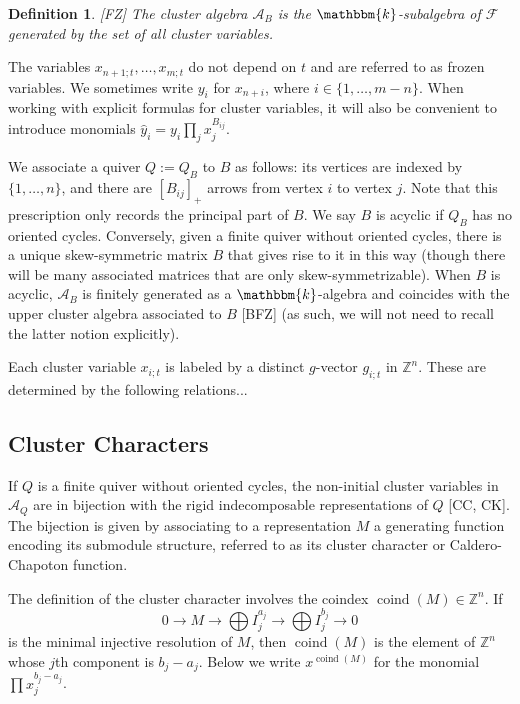 \documentclass[12pt]{amsart}
\newcommand{\sayHW}[1]{\say[HW]{\color{violet}{\bf HW:}\;#1}}
\newcommand{\sayDR}[1]{\say[DR]{\color{red}{\bf DR:}\;#1}}
\newcommand{\cA}{\mathcal{A}}
\newcommand{\ZZ}{\mathbb{Z}}
\newcommand{\kk}{\mathbbm{k}}
\newcommand{\cF}{\mathcal{F}}
\DeclareMathOperator{\coind}{coind}
\newtheorem{definition}[theorem]{Definition}
\numberwithin{equation}{section}
\begin{document}
\begin{definition}
\emph{[FZ]} The cluster algebra $\cA_B$ is the $\kk$-subalgebra of $\cF$ generated by the set of all cluster variables.
\end{definition}

The variables $x_{n+1;t},\dotsc, x_{m;t}$ do not depend on $t$ and are referred to as frozen variables. We sometimes write $y_i$ for $x_{n+i}$, where $i \in \{1,\dotsc, m-n\}$. When working with explicit formulas for cluster variables, it will also be convenient to introduce monomials $\hat{y}_i = y_i\prod_j x_j^{B_{ij}}$. \sayHW{Check $\hat{y}$ formula}

We associate a quiver $Q := Q_B$ to $B$ as follows: its vertices are indexed by $\{1,\dotsc,n\}$, and there are $[B_{ij}]_+$ arrows from vertex $i$ to vertex $j$. 
Note that this prescription only records the principal part of $B$. 
We say $B$ is acyclic if $Q_B$ has no oriented cycles. 
Conversely, given a finite quiver without oriented cycles, there is a unique skew-symmetric matrix $B$ that gives rise to it in this way (though there will be many associated matrices that are only skew-symmetrizable). 
When $B$ is acyclic, $\cA_B$ is finitely generated as a $\kk$-algebra and %
coincides with the upper cluster algebra associated to $B$ [BFZ] (as such, we will not need to recall the latter notion explicitly).  

Each cluster variable $x_{i;t}$ is labeled by a distinct $g$-vector $g_{i;t}$ in $\ZZ^n$. These are determined by the following relations...

\subsection{Cluster Characters}

If $Q$ is a finite quiver without oriented cycles, the non-initial cluster variables in $\cA_Q$ are in bijection with the rigid indecomposable representations of $Q$ [CC, CK]. The bijection is given by associating to a representation $M$ a generating function encoding its submodule structure, referred to as its cluster character or Caldero-Chapoton function. 

The definition of the cluster character involves the coindex $\coind(M) \in \ZZ^n$. If
\[
0 \to M \to \bigoplus I_j^{a_j} \to \bigoplus I_j^{b_j} \to 0
\]
is the minimal injective resolution of $M$, then $\coind(M)$ is the element of $\ZZ^n$ whose $j$th component is $b_j - a_j$. Below we write $x^{\coind(M)}$ for the monomial $\prod x_j^{b_j - a_j}$. 
\end{document}
